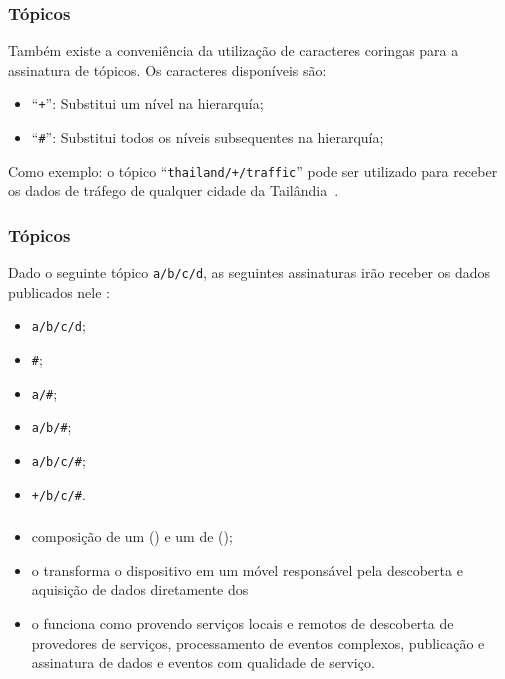 \documentclass[aspectratio=169]{beamer}
\begin{document}
\begin{frame}
	\frametitle{Tópicos \mqtt}
	Também existe a conveniência da utilização de caracteres coringas para a assinatura de tópicos.
	Os caracteres disponíveis são:
	\begin{itemize}
		\item ``\texttt{+}'': Substitui um nível na hierarquía;
		\item ``\texttt{\#}'': Substitui todos os níveis subsequentes na hierarquía;
	\end{itemize}
	
	Como exemplo: o tópico ``\texttt{thailand/+/traffic}'' pode ser utilizado para receber os dados de tráfego de qualquer cidade da Tailândia~\cite{hunkeler:truong:stanford-clark:2008}.
\end{frame}

\begin{frame}
	\frametitle{Tópicos \mqtt}
	Dado o seguinte tópico \texttt{a/b/c/d}, as seguintes assinaturas irão receber os dados publicados nele \cite{light:mosquitto}:
	\begin{itemize}
		\item \texttt{a/b/c/d};
		\item \texttt{\#};
		\item \texttt{a/\#};
		\item \texttt{a/b/\#};
		\item \texttt{a/b/c/\#};
		\item \texttt{+/b/c/\#}.
	\end{itemize}

	
\end{frame}

\begin{frame}
	\frametitle{\mhubcddl}
	\begin{itemize}
		\item composição de um \gateway (\mhub) e um \middleware de \iomt (\cddl);
			
		\item o \mhub transforma o dispositivo \android em um \gateway \iot móvel responsável pela descoberta e aquisição de dados diretamente dos \smartobjs
			
		\item o \cddl funciona como \middleware provendo serviços locais e remotos de descoberta de provedores de serviços, processamento de eventos complexos, publicação e assinatura de dados e eventos com qualidade de serviço.
	\end{itemize}
\end{frame}
\end{document}
